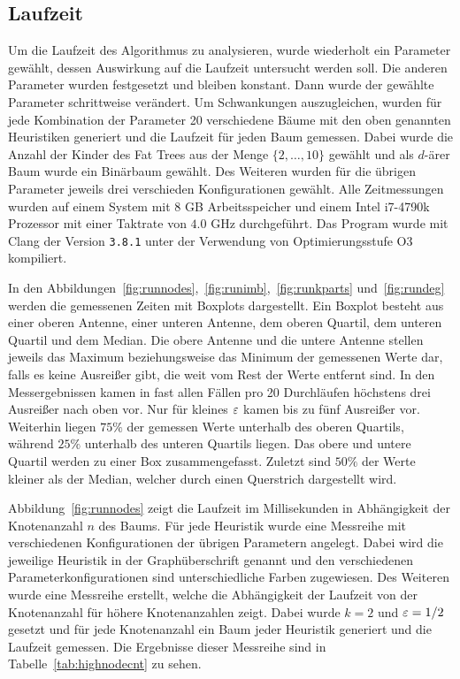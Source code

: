 \subsection{Laufzeit}\label{sec:exprun}
Um die Laufzeit des Algorithmus zu analysieren, wurde wiederholt ein Parameter gewählt, dessen Auswirkung auf die Laufzeit untersucht werden soll.
Die anderen Parameter wurden festgesetzt und bleiben konstant.
Dann wurde der gewählte Parameter schrittweise verändert.
Um Schwankungen auszugleichen, wurden für jede Kombination der Parameter 20 verschiedene Bäume mit den oben genannten Heuristiken generiert und die Laufzeit für jeden Baum gemessen.
Dabei wurde die Anzahl der Kinder des Fat Trees aus der Menge $\{2, \ldots, 10\}$ gewählt und als $d$\hyp ärer Baum wurde ein Binärbaum gewählt.
Des Weiteren wurden für die übrigen Parameter jeweils drei verschieden Konfigurationen gewählt.
Alle Zeitmessungen wurden auf einem System mit $8$ GB Arbeitsspeicher und einem Intel i7-4790k Prozessor mit einer Taktrate von $4.0$ GHz durchgeführt.
Das Program wurde mit Clang der Version \texttt{3.8.1} unter der Verwendung von Optimierungsstufe O3 kompiliert.

In den Abbildungen~\ref{fig:runnodes},~\ref{fig:runimb},~\ref{fig:runkparts} und~\ref{fig:rundeg} werden die gemessenen Zeiten mit Boxplots dargestellt.
Ein Boxplot besteht aus einer oberen Antenne, einer unteren Antenne, dem oberen Quartil, dem unteren Quartil und dem Median.
Die obere Antenne und die untere Antenne stellen jeweils das Maximum beziehungsweise das Minimum der gemessenen Werte dar, falls es keine Ausreißer gibt, die weit vom Rest der Werte entfernt sind.
In den Messergebnissen kamen in fast allen Fällen pro 20 Durchläufen höchstens drei Ausreißer nach oben vor.
Nur für kleines $\varepsilon$ kamen bis zu fünf Ausreißer vor.
Weiterhin liegen $75\%$ der gemessen Werte unterhalb des oberen Quartils, während $25\%$ unterhalb des unteren Quartils liegen.
Das obere und untere Quartil werden zu einer Box zusammengefasst.
Zuletzt sind $50\%$ der Werte kleiner als der Median, welcher durch einen Querstrich dargestellt wird.

Abbildung~\ref{fig:runnodes} zeigt die Laufzeit im Millisekunden in Abhängigkeit der Knotenanzahl $n$ des Baums.
Für jede Heuristik wurde eine Messreihe mit verschiedenen Konfigurationen der übrigen Parametern angelegt.
Dabei wird die jeweilige Heuristik in der Graphüberschrift genannt und den verschiedenen Parameterkonfigurationen sind unterschiedliche Farben zugewiesen. 
Des Weiteren wurde eine Messreihe erstellt, welche die Abhängigkeit der Laufzeit von der Knotenanzahl für höhere Knotenanzahlen zeigt.
Dabei wurde $k=2$ und $\varepsilon=1/2$ gesetzt und für jede Knotenanzahl ein Baum jeder Heuristik generiert und die Laufzeit gemessen.
Die Ergebnisse dieser Messreihe sind in Tabelle~\ref{tab:highnodecnt} zu sehen.

